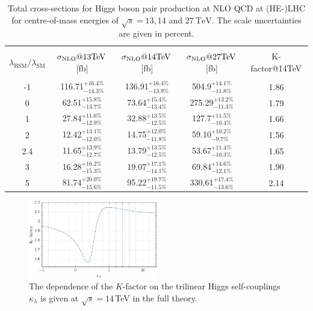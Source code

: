 \documentclass[a4paper]{jpconf}
\newcommand{\TeV}{\ensuremath{\mathrm{\:TeV}}}
\newcommand{\chhh}{\ensuremath{\kappa_{\lambda}}}
\begin{document}
\begin{table}[htb!]
\begin{center}
\begin{tabular}{| c | c | c |c|c|}
\hline
&&&&\\
$\lambda_{\mathrm{BSM}}/\lambda_{\mathrm{SM}}$ & $\sigma_{\rm{NLO}}@13 \mathrm{TeV}$\,[fb]& $\sigma_{\rm{NLO}}@14 \mathrm{TeV}$\,[fb] & $\sigma_{\rm{NLO}}@27 \mathrm{TeV}$\,[fb] &K-factor@14TeV\\
&&&&\\
\hline
-1& 116.71$^{+16.4\%}_{-14.3\%}$  & 136.91$^{+16.4\%}_{-13.9\%}$& 504.9$^{+14.1\%}_{-11.8\%}$ & 1.86 \\
\hline
0& 62.51$^{+15.8\%}_{-13.7\%}$ & 73.64$^{+15.4\%}_{-13.4\%}$& 275.29$^{+13.2\%}_{-11.3\%}$& 1.79  \\
\hline 
1& 27.84$^{+11.6\%}_{-12.9\%}$ & 32.88$^{+13.5\%}_{-12.5\%}$&127.7$^{+11.5\%}_{-10.4\%}$ &1.66\\
\hline
2 & 12.42$^{+13.1\%}_{-12.0\%}$ & 14.75$^{+12.0\%}_{-11.8\%}$ &  59.10$^{+10.2\%}_{-9.7\%}$ & 1.56 \\
\hline
2.4& 11.65$^{+13.9\%}_{-12.7\%}$ & 13.79$^{+13.5\%}_{-12.5\%}$& 53.67$^{+11.4\%}_{-10.3\%}$ & 1.65 \\
\hline
3& 16.28$^{+16.2\%}_{-15.3\%}$ & 19.07$^{+17.1\%}_{-14.1\%}$ & 69.84$^{+14.6\%}_{-12.1\%}$ & 1.90 \\
\hline 
5& 81.74$^{+20.0\%}_{-15.6\%}$  & 95.22$^{+19.7\%}_{-11.5\%}$& 330.61$^{+17.4\%}_{-13.6\%}$ & 2.14 \\
\hline 
\end{tabular}
\end{center}
\caption{Total cross-sections  for Higgs boson pair production at NLO QCD at (HE-)LHC for centre-of-mass energies of $\sqrt{s}=13,14$ and $27 \TeV$. The scale uncertainties are given in percent.
\label{tab:sigmatot}}
\end{table}

\begin{figure}[htb!]
  \centering
    \includegraphics[width=0.5\textwidth]{figures/Kfactor.pdf}
\caption{The dependence of the $K$-factor on the trilinear Higgs self-couplings $\chhh$ is given at $\sqrt{s}=14$\,TeV in the full theory.}
\label{fig:Kfacvariation}
\end{figure}
\end{document}

